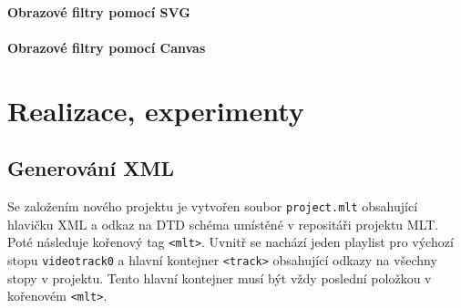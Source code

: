 \subsubsection{Obrazové filtry pomocí SVG}


\subsubsection{Obrazové filtry pomocí Canvas}


\chapter{Realizace, experimenty}

\section{Generování XML}
Se založením nového projektu je vytvořen soubor \texttt{project.mlt} obsahující hlavičku XML a odkaz na DTD schéma umístěné v repositáři projektu MLT. Poté následuje kořenový tag \texttt{<mlt>}. Uvnitř se nachází jeden playlist pro výchozí stopu \texttt{videotrack0} a hlavní kontejner \texttt{<track>} obsahující odkazy na všechny stopy v projektu. Tento hlavní kontejner musí být vždy poslední položkou v kořenovém \texttt{<mlt>}.

